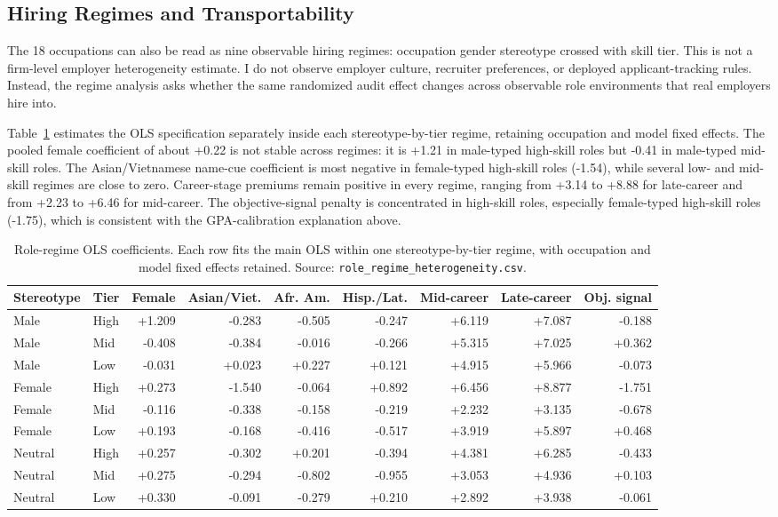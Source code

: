 \documentclass[10pt,twocolumn,letterpaper]{article}
\begin{document}
\subsection{Hiring Regimes and Transportability}

The 18 occupations can also be read as nine observable hiring regimes: occupation gender stereotype crossed with skill tier. This is not a firm-level employer heterogeneity estimate. I do not observe employer culture, recruiter preferences, or deployed applicant-tracking rules. Instead, the regime analysis asks whether the same randomized audit effect changes across observable role environments that real employers hire into.

Table~\ref{tab:regime} estimates the OLS specification separately inside each stereotype-by-tier regime, retaining occupation and model fixed effects. The pooled female coefficient of about +0.22 is not stable across regimes: it is +1.21 in male-typed high-skill roles but -0.41 in male-typed mid-skill roles. The Asian/Vietnamese name-cue coefficient is most negative in female-typed high-skill roles (-1.54), while several low- and mid-skill regimes are close to zero. Career-stage premiums remain positive in every regime, ranging from +3.14 to +8.88 for late-career and from +2.23 to +6.46 for mid-career. The objective-signal penalty is concentrated in high-skill roles, especially female-typed high-skill roles (-1.75), which is consistent with the GPA-calibration explanation above.

\begin{table}[t]
\centering
\caption{Role-regime OLS coefficients. Each row fits the main OLS within one stereotype-by-tier regime, with occupation and model fixed effects retained. Source: \texttt{role\_regime\_heterogeneity.csv}.}
\label{tab:regime}
\scriptsize
\begin{tabular}{llrrrrrrr}
\toprule
Stereotype & Tier & Female & Asian/Viet. & Afr. Am. & Hisp./Lat. & Mid-career & Late-career & Obj. signal \\
\midrule
Male & High & +1.209 & -0.283 & -0.505 & -0.247 & +6.119 & +7.087 & -0.188 \\
Male & Mid & -0.408 & -0.384 & -0.016 & -0.266 & +5.315 & +7.025 & +0.362 \\
Male & Low & -0.031 & +0.023 & +0.227 & +0.121 & +4.915 & +5.966 & -0.073 \\
Female & High & +0.273 & -1.540 & -0.064 & +0.892 & +6.456 & +8.877 & -1.751 \\
Female & Mid & -0.116 & -0.338 & -0.158 & -0.219 & +2.232 & +3.135 & -0.678 \\
Female & Low & +0.193 & -0.168 & -0.416 & -0.517 & +3.919 & +5.897 & +0.468 \\
Neutral & High & +0.257 & -0.302 & +0.201 & -0.394 & +4.381 & +6.285 & -0.433 \\
Neutral & Mid & +0.275 & -0.294 & -0.802 & -0.955 & +3.053 & +4.936 & +0.103 \\
Neutral & Low & +0.330 & -0.091 & -0.279 & +0.210 & +2.892 & +3.938 & -0.061 \\
\bottomrule
\end{tabular}
\end{table}
\end{document}
